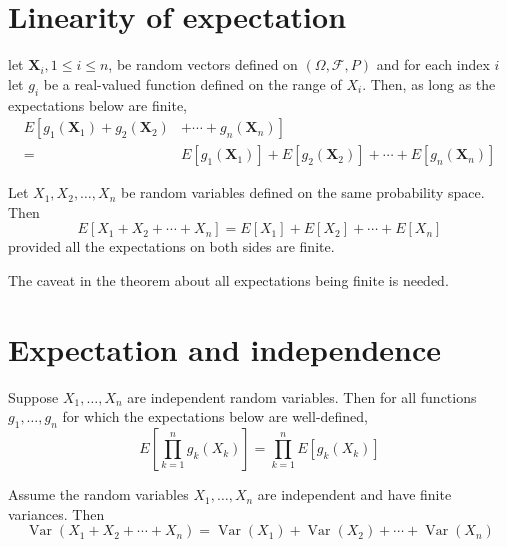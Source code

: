 \documentclass[11pt]{elegantbook}
\begin{document}
\section{Linearity of expectation}

\begin{theorem}
    let $\mathbf{X}_i, 1 \leq i \leq n$, be random vectors defined on $(\Omega, \mathcal{F}, P)$ and for each index $i$ let $g_i$ be a real-valued function defined on the range of $X_i$. Then, as long as the expectations below are finite,
$$
\begin{aligned}
E\left[g_1\left(\mathbf{X}_1\right)+g_2\left(\mathbf{X}_2\right)\right. & \left.+\cdots+g_n\left(\mathbf{X}_n\right)\right] \\
= & E\left[g_1\left(\mathbf{X}_1\right)\right]+E\left[g_2\left(\mathbf{X}_2\right)\right]+\cdots+E\left[g_n\left(\mathbf{X}_n\right)\right]
\end{aligned}
$$
\end{theorem}

\begin{corollary}
 Let $X_1, X_2, \ldots, X_n$ be random variables defined on the same probability space. Then
$$
E\left[X_1+X_2+\cdots+X_n\right]=E\left[X_1\right]+E\left[X_2\right]+\cdots+E\left[X_n\right]
$$
provided all the expectations on both sides are finite.
\end{corollary}
\begin{note}
    The caveat in the theorem about all expectations being finite is needed.
\end{note}
\section{Expectation and independence}
\begin{theorem}
Suppose $X_1, \ldots, X_n$ are independent random variables. Then for all functions $g_1, \ldots, g_n$ for which the expectations below are well-defined,
$$
E\left[\prod_{k=1}^n g_k\left(X_k\right)\right]=\prod_{k=1}^n E\left[g_k\left(X_k\right)\right]
$$
\end{theorem}

\begin{theorem}
Assume the random variables $X_1, \ldots, X_n$ are independent and have finite variances. Then
$$
\operatorname{Var}\left(X_1+X_2+\cdots+X_n\right)=\operatorname{Var}\left(X_1\right)+\operatorname{Var}\left(X_2\right)+\cdots+\operatorname{Var}\left(X_n\right)
$$
\end{theorem}
\end{document}
